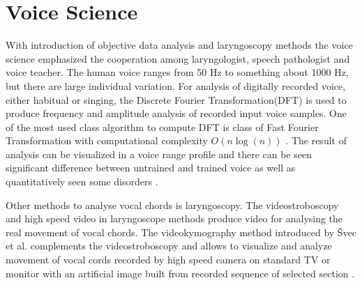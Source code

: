 %

\section{Voice Science}
\label{sec:voice}
With introduction of objective data analysis and laryngoscopy methods the voice science emphasized the cooperation among  laryngologist, speech pathologist and voice teacher.
The human voice ranges from 50 Hz to something about 1000 Hz, but there are large  individual variation. For analysis of digitally recorded voice, either habitual or singing, the Discrete Fourier Transformation(DFT) is used to produce frequency and amplitude analysis of recorded input voice samples. One of the most used class algorithm to compute DFT is class of Fast Fourier Transformation with computational complexity $O(n \log(n))$ \cite{Cooley1965,Frigo2005}.
The result of analysis can be visualized in a voice range profile and there can be seen significant difference between untrained and trained voice as well as quantitatively seen some disorders  \cite{DeLeoLeBorgne2002,wuyts2003effects}.

Other methods to analyse vocal chords is laryngoscopy. The videostroboscopy and high speed video in laryngoscope methods produce video for analysing the real movement of vocal chords. The videokymography method introduced by Švec et al. complements the videostroboscopy and allows to visualize and analyze movement of vocal cords recorded by high speed camera on standard TV or monitor with an artificial image built from recorded sequence of selected section \cite{Svec1996,Svec2007}. 


